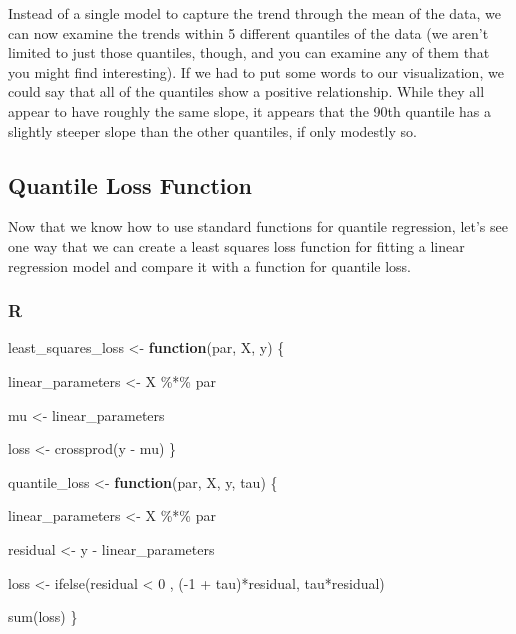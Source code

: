 \documentclass[
  letterpaper,
]{krantz}
\newenvironment{Shaded}{}{}
\newcommand{\ControlFlowTok}[1]{\textcolor[rgb]{0.00,0.44,0.13}{\textbf{#1}}}
\newcommand{\DecValTok}[1]{\textcolor[rgb]{0.25,0.63,0.44}{#1}}
\newcommand{\FunctionTok}[1]{\textcolor[rgb]{0.02,0.16,0.49}{#1}}
\newcommand{\NormalTok}[1]{#1}
\newcommand{\OtherTok}[1]{\textcolor[rgb]{0.00,0.44,0.13}{#1}}
\newcommand{\SpecialCharTok}[1]{\textcolor[rgb]{0.25,0.44,0.63}{#1}}
\begin{document}
Instead of a single model to capture the trend through the mean of the
data, we can now examine the trends within 5 different quantiles of the
data (we aren't limited to just those quantiles, though, and you can
examine any of them that you might find interesting). If we had to put
some words to our visualization, we could say that all of the quantiles
show a positive relationship. While they all appear to have roughly the
same slope, it appears that the 90th quantile has a slightly steeper
slope than the other quantiles, if only modestly so.

\subsection{Quantile Loss Function}\label{quantile-loss-function}

Now that we know how to use standard functions for quantile regression,
let's see one way that we can create a least squares loss function for
fitting a linear regression model and compare it with a function for
quantile loss.

\subsubsection{R}

\begin{Shaded}
\begin{Highlighting}[]
\NormalTok{least\_squares\_loss }\OtherTok{\textless{}{-}} \ControlFlowTok{function}\NormalTok{(par, X, y) \{}
  
\NormalTok{  linear\_parameters }\OtherTok{\textless{}{-}}\NormalTok{ X }\SpecialCharTok{\%*\%}\NormalTok{ par}
  
\NormalTok{  mu }\OtherTok{\textless{}{-}}\NormalTok{ linear\_parameters   }
  
\NormalTok{  loss }\OtherTok{\textless{}{-}} \FunctionTok{crossprod}\NormalTok{(y }\SpecialCharTok{{-}}\NormalTok{ mu)}
\NormalTok{\}}
\end{Highlighting}
\end{Shaded}

\begin{Shaded}
\begin{Highlighting}[]
\NormalTok{quantile\_loss }\OtherTok{\textless{}{-}} \ControlFlowTok{function}\NormalTok{(par, X, y, tau) \{}
  
\NormalTok{  linear\_parameters }\OtherTok{\textless{}{-}}\NormalTok{ X }\SpecialCharTok{\%*\%}\NormalTok{ par}
  
\NormalTok{  residual }\OtherTok{\textless{}{-}}\NormalTok{ y }\SpecialCharTok{{-}}\NormalTok{ linear\_parameters}
  
\NormalTok{  loss }\OtherTok{\textless{}{-}} \FunctionTok{ifelse}\NormalTok{(residual }\SpecialCharTok{\textless{}} \DecValTok{0}\NormalTok{ , }
\NormalTok{                (}\SpecialCharTok{{-}}\DecValTok{1} \SpecialCharTok{+}\NormalTok{ tau)}\SpecialCharTok{*}\NormalTok{residual, }
\NormalTok{                tau}\SpecialCharTok{*}\NormalTok{residual)}
  
  \FunctionTok{sum}\NormalTok{(loss)}
\NormalTok{\}}
\end{Highlighting}
\end{Shaded}
\end{document}
